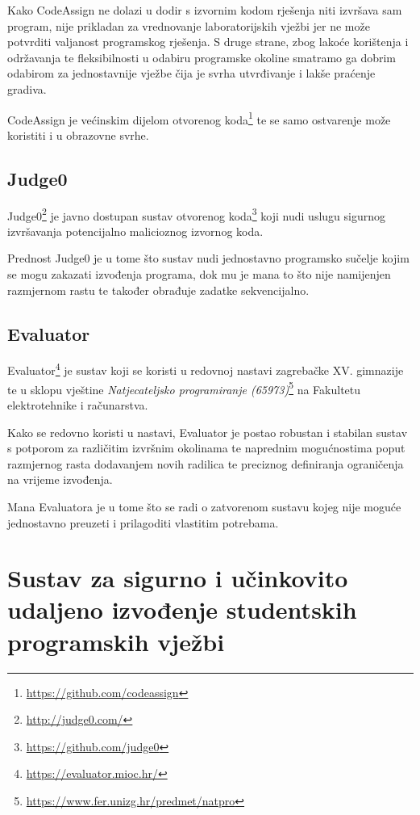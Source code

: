 \documentclass[times, utf8, zavrsni]{fer}
\begin{document}
Kako CodeAssign ne dolazi u dodir s izvornim kodom rješenja niti izvršava sam program, nije prikladan za vrednovanje laboratorijskih vježbi jer ne može potvrditi valjanost programskog rješenja. S druge strane, zbog lakoće korištenja i održavanja te fleksibilnosti u odabiru programske okoline smatramo ga dobrim odabirom za jednostavnije vježbe čija je svrha utvrđivanje i lakše praćenje gradiva.

CodeAssign je većinskim dijelom otvorenog koda{\footnote{\url{https://github.com/codeassign}}} te se samo ostvarenje može koristiti i u obrazovne svrhe.

\section{Judge0}

Judge0{\footnote{\url{http://judge0.com/}}} je javno dostupan sustav otvorenog koda{\footnote{\url{https://github.com/judge0}}} koji nudi uslugu sigurnog izvršavanja potencijalno malicioznog izvornog koda.

Prednost Judge0 je u tome što sustav nudi jednostavno programsko sučelje kojim se mogu zakazati izvođenja programa, dok mu je mana to što nije namijenjen razmjernom rastu te također obrađuje zadatke sekvencijalno. 

\section{Evaluator}

Evaluator{\footnote{\url{https://evaluator.mioc.hr/}}} je sustav koji se koristi u redovnoj nastavi zagrebačke XV. gimnazije te u sklopu vještine {\textit{Natjecateljsko programiranje (65973)}}{\footnote{\url{https://www.fer.unizg.hr/predmet/natpro}}} na Fakultetu elektrotehnike i računarstva.

Kako se redovno koristi u nastavi, Evaluator je postao robustan i stabilan sustav s potporom za različitim izvršnim okolinama te naprednim mogućnostima poput razmjernog rasta dodavanjem novih radilica te preciznog definiranja ograničenja na vrijeme izvođenja.

Mana Evaluatora je u tome što se radi o zatvorenom sustavu kojeg nije moguće jednostavno preuzeti i prilagoditi vlastitim potrebama.

\chapter{Sustav za sigurno i učinkovito udaljeno izvođenje studentskih programskih vježbi}
\end{document}
